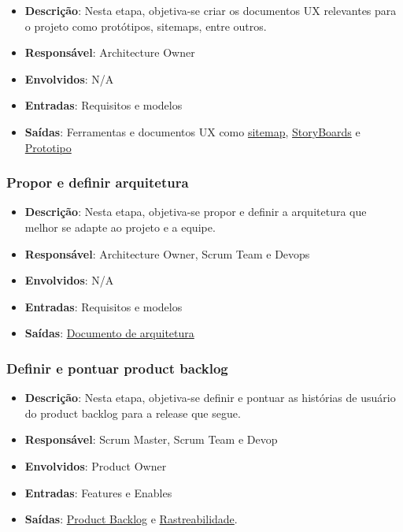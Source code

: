\begin{itemize}
  \item \textbf{Descrição}: Nesta etapa, objetiva-se criar os documentos UX relevantes para o projeto como protótipos, sitemaps, entre outros.
  \item \textbf{Responsável}: Architecture Owner
  \item \textbf{Envolvidos}: N/A
  \item \textbf{Entradas}: Requisitos e modelos
  \item \textbf{Saídas}: Ferramentas e documentos UX como \href{https://victorarnaud.github.io/TBL/sitemap/}{sitemap}, \href{https://victorarnaud.github.io/TBL/storyboards/}{StoryBoards} e \href{https://github.com/VictorArnaud/TBL/wiki/Prot%C3%B3tipo}{Prototipo}
\end{itemize}

\subsubsection{Propor e definir arquitetura}

\begin{itemize}
  \item \textbf{Descrição}: Nesta etapa, objetiva-se propor e definir a arquitetura que melhor se adapte ao projeto e a equipe.
  \item \textbf{Responsável}: Architecture Owner, Scrum Team e Devops
  \item \textbf{Envolvidos}: N/A
  \item \textbf{Entradas}: Requisitos e modelos
  \item \textbf{Saídas}: \href{https://victorarnaud.github.io/TBL/contribuicao/arquitetura/}{Documento de arquitetura}
\end{itemize}

\subsubsection{Definir e pontuar product backlog}

\begin{itemize}
  \item \textbf{Descrição}: Nesta etapa, objetiva-se definir e pontuar as histórias de usuário do product backlog para a release que segue.
  \item \textbf{Responsável}: Scrum Master, Scrum Team e Devop
  \item \textbf{Envolvidos}: Product Owner
  \item \textbf{Entradas}: Features e Enables
  \item \textbf{Saídas}: \href{https://github.com/VictorArnaud/TBL/wiki/Product-Backlog}{Product Backlog} e \href{https://github.com/VictorArnaud/TBL/wiki/Rastreabilidade-de-requisitos}{Rastreabilidade}.
\end{itemize}

